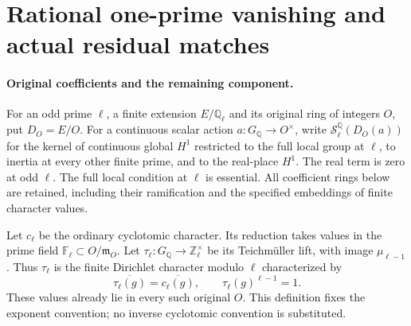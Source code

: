 \section{Rational one-prime vanishing and actual residual matches}
\label{sec:rational-one-prime-residual-match}

\paragraph{Original coefficients and the remaining component.}
For an odd prime $\ell$, a finite extension $E/\mathbb Q_\ell$
and its original ring of integers $O$, put $D_O=E/O$.
For a continuous scalar action $a:G_{\mathbb Q}\to O^\times$,
write $\mathcal S^{\mathbb Q}_\ell(D_O(a))$ for the kernel of
continuous global $H^1$ restricted to the full local group at
$\ell$, to inertia at every other finite prime, and to the
real-place $H^1$. The real term is zero at odd $\ell$.
The full local condition at $\ell$ is essential.
All coefficient rings below are retained, including their
ramification and the specified embeddings of finite character values.

Let $c_\ell$ be the ordinary cyclotomic character.
Its reduction takes values in the prime field
$\mathbb F_\ell\subset O/\mathfrak m_O$.
Let $\tau_\ell:G_{\mathbb Q}\to\mathbb Z_\ell^\times$ be its
Teichm\"uller lift, with image $\mu_{\ell-1}$.
Thus $\tau_\ell$ is the finite Dirichlet character modulo $\ell$
characterized by
\[
 \overline{\tau_\ell(g)}=\overline{c_\ell(g)},\qquad
 \tau_\ell(g)^{\ell-1}=1.
 \tag{RQM.1}
\]
These values already lie in every such original $O$.
This definition fixes the exponent convention; no inverse
cyclotomic convention is substituted.

